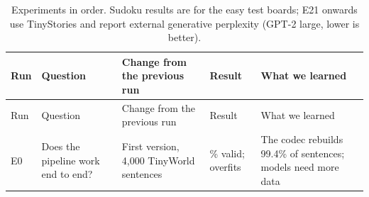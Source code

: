 \documentclass[
  british,
]{article}
\begin{document}
\begin{longtable}[]{@{}
  >{\raggedright\arraybackslash}p{}
  >{\raggedright\arraybackslash}p{}
  >{\raggedright\arraybackslash}p{}
  >{\raggedright\arraybackslash}p{}
  >{\raggedright\arraybackslash}p{}@{}}
\caption{Experiments in order. Sudoku results are for the easy test
boards; E21 onwards use TinyStories and report external generative
perplexity (GPT-2 large, lower is better).}\tabularnewline
\toprule\noalign{}
\begin{minipage}[b]{\linewidth}\raggedright
Run
\end{minipage} & \begin{minipage}[b]{\linewidth}\raggedright
Question
\end{minipage} & \begin{minipage}[b]{\linewidth}\raggedright
Change from the previous run
\end{minipage} & \begin{minipage}[b]{\linewidth}\raggedright
Result
\end{minipage} & \begin{minipage}[b]{\linewidth}\raggedright
What we learned
\end{minipage} \\
\midrule\noalign{}
\endfirsthead
\toprule\noalign{}
\begin{minipage}[b]{\linewidth}\raggedright
Run
\end{minipage} & \begin{minipage}[b]{\linewidth}\raggedright
Question
\end{minipage} & \begin{minipage}[b]{\linewidth}\raggedright
Change from the previous run
\end{minipage} & \begin{minipage}[b]{\linewidth}\raggedright
Result
\end{minipage} & \begin{minipage}[b]{\linewidth}\raggedright
What we learned
\end{minipage} \\
\midrule\noalign{}
\endhead
\bottomrule\noalign{}
\endlastfoot
E0 & Does the pipeline work end to end? & First version, 4,000 TinyWorld
sentences & 94.6\% valid; overfits & The codec rebuilds 99.4\% of
sentences; models need more data \\

\end{longtable}
\end{document}

